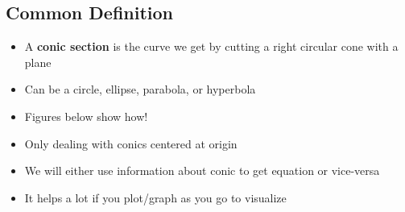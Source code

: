 \documentclass[letterpaper, 11pt, openany]{book}
\theoremstyle{mytheoremstyle}
\theoremstyle{myexamplestyle}
\begin{document}
\subsection{Common Definition}
\begin{itemize}
    \item A \textbf{conic section} is the curve we get by cutting a right circular cone with a plane
    \item Can be a circle, ellipse, parabola, or hyperbola
    \item Figures below show how!
    \item Only dealing with conics centered at origin
    \item We will either use information about conic to get equation or vice-versa
    \item[\faThumbsUp] It helps a lot if you plot/graph as you go to visualize
\end{itemize}
\end{document}
